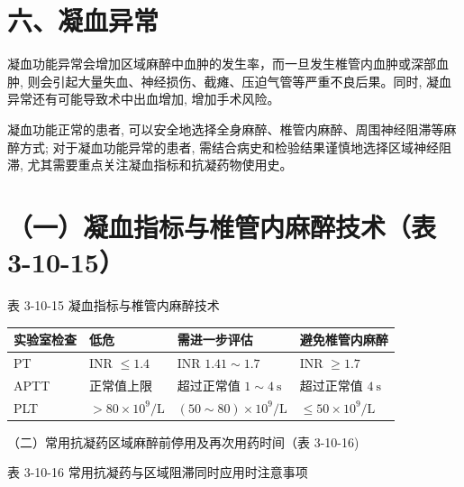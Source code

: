 \documentclass[10pt]{article}
\begin{document}
\section*{六、凝血异常}
凝血功能异常会增加区域麻醉中血肿的发生率，而一旦发生椎管内血肿或深部血肿, 则会引起大量失血、神经损伤、截瘫、压迫气管等严重不良后果。同时, 凝血异常还有可能导致术中出血增加, 增加手术风险。

凝血功能正常的患者, 可以安全地选择全身麻醉、椎管内麻醉、周围神经阻滞等麻醉方式; 对于凝血功能异常的患者, 需结合病史和检验结果谨慎地选择区域神经阻滞, 尤其需要重点关注凝血指标和抗凝药物使用史。

\section*{（一）凝血指标与椎管内麻醉技术（表 3-10-15）}
表 3-10-15 凝血指标与椎管内麻醉技术

\begin{center}
\begin{tabular}{llll}
\hline
实验室检查 & 低危 & 需进一步评估 & 避免椎管内麻醉 \\
\hline
PT & INR $\leqslant 1.4$ & INR $1.41 \sim 1.7$ & INR $\geqslant 1.7$ \\
APTT & 正常值上限 & 超过正常值 $1 \sim 4 \mathrm{~s}$ & 超过正常值 $4 \mathrm{~s}$ \\
PLT & $>80 \times 10^{9} / \mathrm{L}$ & $(50 \sim 80) \times 10^{9} / \mathrm{L}$ & $\leqslant 50 \times 10^{9} / \mathrm{L}$ \\
\hline
\end{tabular}
\end{center}

（二）常用抗凝药区域麻醉前停用及再次用药时间（表 3-10-16)

表 3-10-16 常用抗凝药与区域阻滞同时应用时注意事项
\end{document}
